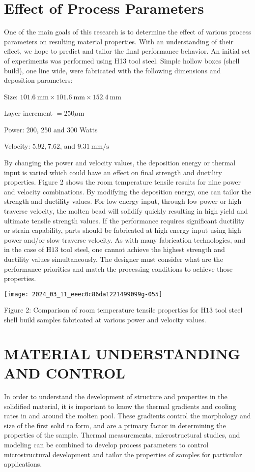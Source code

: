 \documentclass[10pt]{article}
\begin{document}
\section*{Effect of Process Parameters}
One of the main goals of this research is to determine the effect of various process parameters on resulting material properties. With an understanding of their effect, we hope to predict and tailor the final performance behavior. An initial set of experiments was performed using H13 tool steel. Simple hollow boxes (shell build), one line wide, were fabricated with the following dimensions and deposition parameters:

Size: $101.6 \mathrm{~mm} \times 101.6 \mathrm{~mm} \times 152.4 \mathrm{~mm}$

Layer increment $=250 \mu \mathrm{m}$

Power: 200, 250 and 300 Watts

Velocity: $5.92,7.62$, and $9.31 \mathrm{~mm} / \mathrm{s}$

By changing the power and velocity values, the deposition energy or thermal input is varied which could have an effect on final strength and ductility properties. Figure 2 shows the room temperature tensile results for nine power and velocity combinations. By modifying the deposition energy, one can tailor the strength and ductility values. For low energy input, through low power or high traverse velocity, the molten bead will solidify quickly resulting in high yield and ultimate tensile strength values. If the performance requires significant ductility or strain capability, parts should be fabricated at high energy input using high power and/or slow traverse velocity. As with many fabrication technologies, and in the case of $\mathrm{H} 13$ tool steel, one cannot achieve the highest strength and ductility values simultaneously. The designer must consider what are the performance priorities and match the processing conditions to achieve those properties.

\begin{center}
\texttt{[image: 2024\_03\_11\_eeec0c86da1221499099g-055]}
\end{center}

Figure 2: Comparison of room temperature tensile properties for $\mathrm{H} 13$ tool steel shell build samples fabricated at various power and velocity values.

\section*{MATERIAL UNDERSTANDING AND CONTROL}
In order to understand the development of structure and properties in the solidified material, it is important to know the thermal gradients and cooling rates in and around the molten pool. These gradients control the morphology and size of the first solid to form, and are a primary factor in determining the properties of the sample. Thermal measurements, microstructural studies, and modeling can be combined to develop process parameters to control microstructural development and tailor the properties of samples for particular applications.
\end{document}
